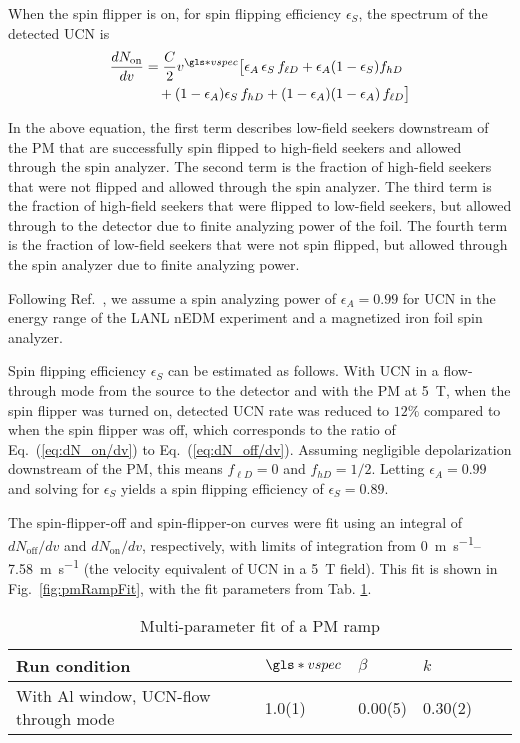 When the spin flipper is on, for spin flipping efficiency $\epsilon_S$, the spectrum of the detected UCN is
%
\begin{align}
    \frac{dN_\text{on}}{dv} &= \frac{C}{2} v^{\gls*{vspec}} \big[ \epsilon_A\,\epsilon_S\, f_{\ell D} + \epsilon_A(1 - \epsilon_S) f_{h D} \nonumber \\
    &\quad + (1 - \epsilon_A)\epsilon_S\,f_{h D}  + (1 - \epsilon_A)(1-\epsilon_A)\,f_{\ell D} \big]\label{eq:dN_on/dv}
\end{align}

In the above equation, the first term describes low-field seekers downstream of the PM that are successfully spin flipped to high-field seekers and allowed through the spin analyzer. The second term is the fraction of high-field seekers that were not flipped and allowed through the spin analyzer. The third term is the fraction of high-field seekers that were flipped to low-field seekers, but allowed through to the detector due to finite analyzing power of the foil. The fourth term is the fraction of low-field seekers that were not spin flipped, but allowed through the spin analyzer due to finite analyzing power.

Following Ref.~\cite{ThorstenThesis}, we assume a spin analyzing power of $\epsilon_A=0.99$ for UCN in the energy range of the LANL nEDM experiment and a magnetized iron foil spin analyzer.

Spin flipping efficiency $\epsilon_S$ can be estimated as follows. With UCN in a flow-through mode from the source to the detector and with the PM at \qty{5}{\tesla}, when the spin flipper was turned on, detected UCN rate was reduced to $12\%$ compared to when the spin flipper was off, which corresponds to the ratio of Eq.~(\ref{eq:dN_on/dv}) to Eq.~(\ref{eq:dN_off/dv}). Assuming negligible depolarization downstream of the PM, this means $f_{\ell D} = 0$ and $f_{hD} = 1/2$. Letting $\epsilon_A=0.99$ and solving for $\epsilon_S$ yields a spin flipping efficiency of $\epsilon_S=0.89$.

The spin-flipper-off and spin-flipper-on curves were fit using an integral of $dN_\text{off}/dv$ and $dN_\text{on}/dv$, respectively, with limits of integration from \qtyrange{0}{7.58}{\meter\per\s} (the velocity equivalent of UCN in a \qty{5}{\tesla} field). This fit is shown in Fig.~\ref{fig:pmRampFit}, with the fit parameters from Tab. \ref{tb:pmRampFit}. 


\begin{table}
\centering
\caption{\label{tb:pmRampFit}Multi-parameter fit of a PM ramp}
\begin{tabular}{llllll}
\toprule
\multicolumn{1}{l}{Run condition} & \multicolumn{1}{l}{$\gls*{vspec}$} & \multicolumn{1}{l}{$\beta$} & \multicolumn{1}{l}{$k$} \\ 
\midrule
With Al window, UCN-flow through mode           & 1.0(1)      & 0.00(5)                 & 0.30(2)   \\
\bottomrule
\end{tabular}
\end{table}



